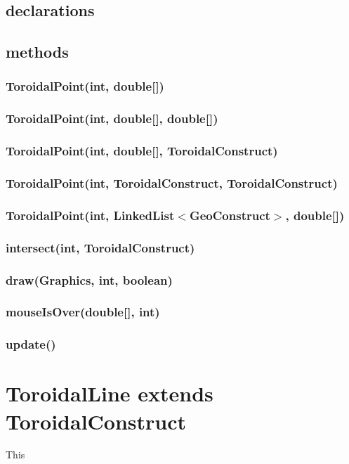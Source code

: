 \documentclass[a4paper,10pt]{report}
\begin{document}
\subsection{declarations}
\subsubsection{}
\subsection{methods}
\subsubsection{ToroidalPoint(int, double[])}
\subsubsection{ToroidalPoint(int, double[], double[])}
\subsubsection{ToroidalPoint(int, double[], ToroidalConstruct)}
\subsubsection{ToroidalPoint(int, ToroidalConstruct, ToroidalConstruct)}
\subsubsection{ToroidalPoint(int, LinkedList$<$GeoConstruct$>$, double[])}
\subsubsection{intersect(int, ToroidalConstruct)}
\subsubsection{draw(Graphics, int, boolean)}
\subsubsection{mouseIsOver(double[], int)}
\subsubsection{update()}
\section{ToroidalLine extends ToroidalConstruct} This
\end{document}
